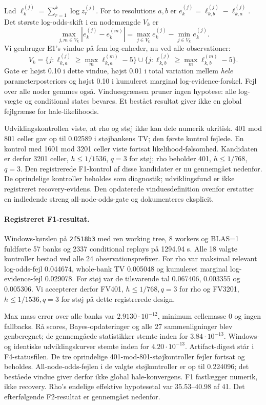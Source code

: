 Lad \(\ell_k^{(j)}=\sum_{r=1}^k\log z_r^{(j)}\). For to resolutions
\(a,b\) er \(e_k^{(j)}=\ell_{k,b}^{(j)}-\ell_{k,a}^{(j)}\). Det største
log-odds-skift i en nodemængde \(V_k\) er
\begin{equation}
 \max_{j,m\in V_k}|e_k^{(j)}-e_k^{(m)}|
 =\max_{j\in V_k}e_k^{(j)}-\min_{j\in V_k}e_k^{(j)}.
\end{equation}
Vi genbruger E1's vindue på fem log-enheder, nu ved alle observationer:
\begin{equation}
 V_k=\{j:\ell_{k,a}^{(j)}\geq\max_m\ell_{k,a}^{(m)}-5\}
 \cup\{j:\ell_{k,b}^{(j)}\geq\max_m\ell_{k,b}^{(m)}-5\}.
\end{equation}
Gate er højst 0.10 i dette vindue, højst 0.01 i total variation mellem
\emph{hele} parameterposteriors og højst 0.10 i kumuleret marginal
log-evidence-forskel. Fejl over alle noder gemmes også. Vinduesgrænsen
pruner ingen hypotese: alle log-vægte og conditional states bevares.
Et bestået resultat giver ikke en global fejlgrænse for hale-likelihoods.

Udviklingskontrollen viste, at rho og støj ikke kan dele numerik ukritisk.
401 mod 801 celler gav op til 0.02589 i støjbankens TV; den første
kontrol fejlede. En kontrol med 1601 mod 3201 celler viste fortsat
likelihood-følsomhed. Kandidaten er derfor 3201 celler, \(h\leq1/1536\),
\(q=3\) for støj; rho beholder 401, \(h\leq1/768\), \(q=3\).
Den registrerede F1-kontrol af disse kandidater er nu gennemgået nedenfor.
De oprindelige kontroller beholdes som diagnostik; udviklingsfund er ikke
registreret recovery-evidens. Den opdaterede vinduesdefinition ovenfor
erstatter en indledende streng all-node-odds-gate og dokumenteres eksplicit.

\paragraph{Registreret F1-resultat.}
Windows-kørslen på \texttt{2f518b3} med ren working tree, 8 workers og BLAS=1
fuldførte 57 banks og 2337 conditional replays på 1294.94 s.
Alle 18 valgte kontroller bestod ved alle 24 observationsprefixer.
For rho var maksimal relevant log-odds-fejl 0.044674, whole-bank TV 0.005048
og kumuleret marginal log-evidence-fejl 0.029078. For støj var de tilsvarende
tal 0.067406, 0.003355 og 0.005306. Vi accepterer derfor FV401,
\(h\leq1/768,q=3\) for rho og FV3201, \(h\leq1/1536,q=3\) for støj
på dette registrerede design.

Max mass error over alle banks var \(2.9130\cdot10^{-12}\), minimum
cellemasse 0 og ingen fallbacks. Rå scores, Bayes-opdateringer og alle
27 sammenligninger blev genberegnet; de gennemgåede statistikker stemte
inden for \(3.84\cdot10^{-13}\). Windows- og identiske udviklingskurver
stemte inden for \(4.20\cdot10^{-13}\). Artifact-digest står i F4-statusfilen.
De tre oprindelige 401-mod-801-støjkontroller fejler fortsat og beholdes.
All-node-odds-fejlen i de valgte støjkontroller er op til 0.224096;
det beståede vindue giver derfor ikke global hale-konvergens.
F1 fastlægger numerik, ikke recovery. Rho's endelige effektive hypotesetal
var 35.53--40.98 af 41. Det efterfølgende F2-resultat er gennemgået nedenfor.

